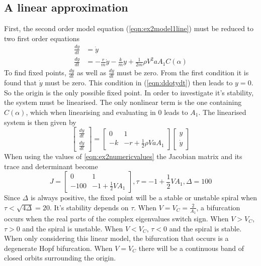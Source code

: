 \subsection{A linear approximation}
First, the second order model equation (\ref{eqn:ex2model1line}) must be reduced to two first order equations
 \begin{align}
 \frac{dy}{dt}&=\dot{y}\label{eqn:dydt}\\
 \frac{d\dot{y}}{dt}&=-\frac{r}{m}\dot{y}-\frac{k}{m}y+\frac{1}{2m}\rho V^2 a A_1 C(\alpha)\label{eqn:ddotydt}
 \end{align}
 To find fixed points, $\frac{dy}{dt}$ as well as $\frac{d\dot{y}}{dt}$ must be zero. From the first condition it is found that $\dot{y}$ must be zero. This condition in (\ref{eqn:ddotydt}) then leads to $y=0$. So the origin is the only possible fixed point. In order to investigate it's stability, the system must be linearised. The only nonlinear term is the one containing $C(\alpha)$, which when linearising and evaluating in $0$ leads to $A_1$. The linearised system is then given by
 \begin{equation}
\begin{bmatrix}\frac{dy}{dt}\\\frac{d\dot{y}}{dt}\end{bmatrix}=\begin{bmatrix}0 & 1\\ -k & -r+\frac{1}{2}\rho VaA_1\end{bmatrix}\begin{bmatrix}y \\ \dot{y}\end{bmatrix}
\end{equation}
When using the values of \ref{eqn:ex2numericvalues} the Jacobian matrix and its trace and determinant become
\begin{equation}
J=\begin{bmatrix}0 & 1 \\-100 & -1+\frac{1}{2}VA_1\end{bmatrix}, \tau=-1+\frac{1}{2}VA_1, \Delta=100
\end{equation}
\hfill\newline
Since $\Delta$ is always positive, the fixed point will be a stable or unstable spiral  when $\tau<\sqrt{4\Delta}=20$. It's stability depends on $\tau$. When $V=V_C=\frac{2}{A_1}$, a bifurcation occurs when the real parts of the complex eigenvalues switch sign. When $V>V_C$, $\tau>0$ and the spiral is unstable. When $V<V_C$, $\tau<0$ and the spiral is stable. When only considering this linear model, the bifurcation that occurs is a degenerate Hopf bifurcation. When $V=V_C$ there will be a continuous band of closed orbits surrounding the origin.
